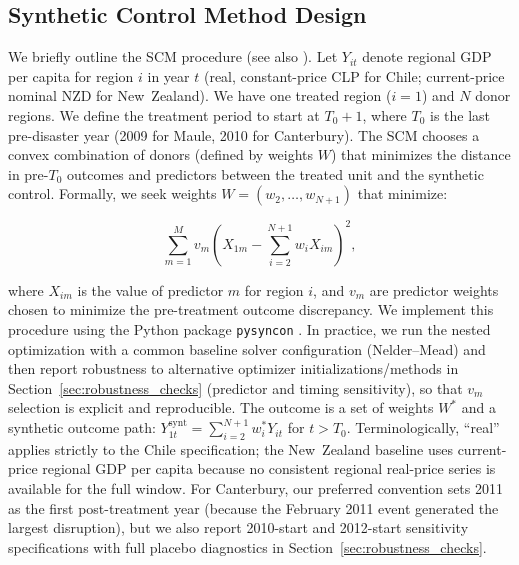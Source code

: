 \documentclass[12pt]{article}
\begin{document}
\subsection{Synthetic Control Method Design}
We briefly outline the SCM procedure (see also \cite{abadie2021jel, abadie2010synthetic}). Let $Y_{it}$ denote regional GDP per capita for region $i$ in year $t$ (real, constant-price CLP for Chile; current-price nominal NZD for New~Zealand). We have one treated region ($i=1$) and $N$ donor regions. We define the treatment period to start at $T_0+1$, where $T_0$ is the last pre-disaster year (2009 for Maule, 2010 for Canterbury). The SCM chooses a convex combination of donors (defined by weights $W$) that minimizes the distance in pre-$T_0$ outcomes and predictors between the treated unit and the synthetic control. Formally, we seek weights $W = (w_2,\dots,w_{N+1})$ that minimize:

$$ \sum_{m=1}^M v_m (X_{1m} - \sum_{i=2}^{N+1} w_i X_{im})^2,$$ 

where $X_{im}$ is the value of predictor $m$ for region $i$, and $v_m$ are predictor weights chosen to minimize the pre-treatment outcome discrepancy. We implement this procedure using the Python package \texttt{pysyncon} \parencite{pysynconpackage}. In practice, we run the nested optimization with a common baseline solver configuration (Nelder--Mead) and then report robustness to alternative optimizer initializations/methods in Section~\ref{sec:robustness_checks} (predictor and timing sensitivity), so that $v_m$ selection is explicit and reproducible. The outcome is a set of weights $W^{*}$ and a synthetic outcome path: $Y_{1t}^{\text{synt}} = \sum_{i=2}^{N+1} w_i^{*} Y_{it}$ for $t > T_0$. Terminologically, ``real'' applies strictly to the Chile specification; the New~Zealand baseline uses current-price regional GDP per capita because no consistent regional real-price series is available for the full window. For Canterbury, our preferred convention sets 2011 as the first post-treatment year (because the February 2011 event generated the largest disruption), but we also report 2010-start and 2012-start sensitivity specifications with full placebo diagnostics in Section~\ref{sec:robustness_checks}.
\end{document}
